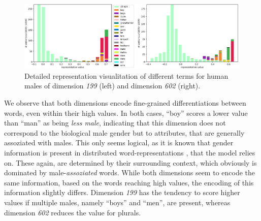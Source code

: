 \begin{figure}[tph!]
\centering
	\includegraphics[totalheight=4.5cm]{fig/mf_detailed.png}
	\caption{Detailed representation visualitation of different terms for human males of dimension \textit{199} (left) and dimension \textit{602} (right).}
	\label{fig:mf_detailed_m}
\end{figure}
We observe that both dimensions encode fine-grained differentiations between words, even within their high values. In both cases, ``boy'' scores a lower value than ``man'' as being \textit{less male}, indicating that this dimension does not correspond to the biological male gender but to attributes, that are generally assoziated with males. This only seems logical, as it is known that gender information is present in distributed word-representations \citep{mikolov2013linguistic}, that the model relies on. These again, are determined by their surrounding context, which obviously is dominated by male-\textit{assoziated} words. While both dimensions seem to encode the same information, based on the words reaching high values, the encoding of this information slightly differs. Dimension \textit{199} has the tendency to score higher values if multiple males, namely ``boys'' and ``men'', are present, whereas dimension \textit{602} reduces the value for plurals. 
\newline

